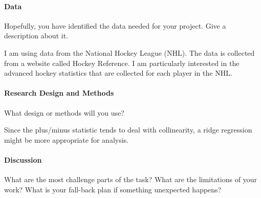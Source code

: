 \documentclass[12pt]{article}
\begin{document}
\paragraph{Data}
Hopefully, you have identified the data needed for your project. Give a
description about it.

I am using data from the National Hockey League (NHL). The data is collected from a website called
Hockey Reference. I am particularly interested in the advanced hockey statistics that are collected
for each player in the NHL. 

\paragraph{Research Design and Methods}
What design or methods will you use?

Since the plus/minus statistic tends to deal with collinearity, a ridge regression might be more
appropriate for analysis.


\paragraph{Discussion}
What are the most challenge parts of the task?
What are the limitations of your work? What is your fall-back plan if
something unexpected happens?




\end{document}
